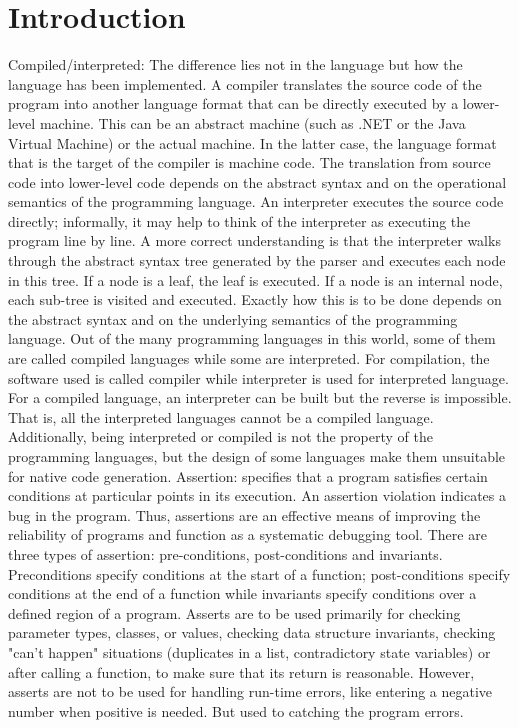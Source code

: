 \documentclass{sig-alternate}
\begin{document}
	\section{Introduction}
	Compiled/interpreted: The difference lies not in the language but how the language has been implemented. A compiler translates the source code of the program into another language format that can be directly executed by a lower-level machine. This can be an abstract machine (such as .NET or the Java Virtual Machine) or the actual machine. In the latter case, the language format that is the target of the compiler is machine code. The translation from source code into lower-level code depends on the abstract syntax and on the operational semantics of the programming language. An interpreter executes the source code directly; informally, it may help to think of the interpreter as executing the program line by line. A more correct understanding is that the interpreter walks through the abstract syntax tree generated by the parser and executes each node in this tree. If a node is a leaf, the leaf is executed. If a node is an internal node, each sub-tree is visited and executed. Exactly how this is to be done depends on the abstract syntax and on the underlying semantics of the programming language.
	Out of the many programming languages in this world, some of them are called compiled languages while some are interpreted. For compilation, the software used is called compiler while interpreter is used for interpreted language. For a compiled language, an interpreter can be built but the reverse is impossible. That is, all the interpreted languages cannot be a compiled language. Additionally, being interpreted or compiled is not the property of the programming languages, but the design of some languages make them unsuitable for native code generation.
	Assertion: specifies that a program satisfies certain conditions at particular points in its execution. An assertion violation indicates a bug in the program. Thus, assertions are an effective means of improving the reliability of programs and function as a systematic debugging tool. There are three types of assertion: pre-conditions, post-conditions and invariants. Preconditions specify conditions at the start of a function; post-conditions specify conditions at the end of a function while invariants specify conditions over a defined region of a program. Asserts are to be used primarily for checking parameter types, classes, or values, checking data structure invariants, checking "can't happen" situations (duplicates in a list, contradictory state variables) or after calling a function, to make sure that its return is reasonable. However, asserts are not to be used for handling run-time errors, like entering a negative number when positive is needed. But used to catching the program errors.
	
\end{document}
